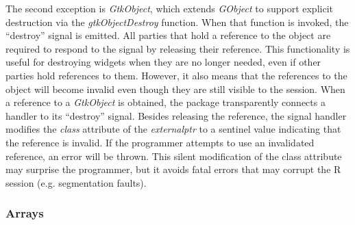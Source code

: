 \documentclass[article]{jss}
\begin{document}
The second exception is \emph{GtkObject}, which extends \emph{GObject}
to support explicit destruction via the \emph{gtkObjectDestroy}
function. When that function is invoked, the ``destroy'' signal is
emitted. All parties that hold a reference to the object are required
to respond to the signal by releasing their reference. This
functionality is useful for destroying widgets when they are no longer
needed, even if other parties hold references to them. However, it
also means that the  references to the object will become
invalid even though they are still visible to the 
session. When a reference to a \emph{GtkObject} is obtained, the
 package transparently connects a handler to its ``destroy'' signal.
Besides releasing the reference, the signal handler modifies the
\emph{class} attribute of the \emph{externalptr} to a sentinel value
indicating that the reference is invalid.  If the programmer attempts
to use an invalidated reference, an error will be thrown.  This silent
modification of the class attribute may surprise the 
programmer, but it avoids fatal errors that may corrupt the R session
(e.g. segmentation faults).

\subsubsection{Arrays}
\end{document}
